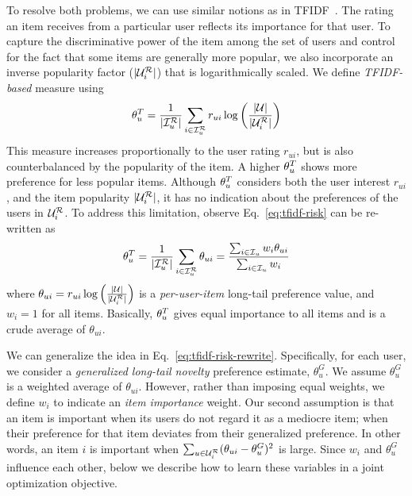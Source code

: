 

To resolve both problems, we can use similar notions as in TFIDF~\cite{salton1988term}.  The rating an item receives from a particular user reflects its importance for that user. To capture the discriminative power of the item among the set of users and control for the fact that some items are generally more popular, we also incorporate an inverse popularity factor  ($|\mathcal{U}_{i}^{\mathcal{R}}|$) that is logarithmically scaled. We define \textit{TFIDF-based} measure using 
\begin{align}
\small
\theta_u^{T} = \frac{ 1}{\vert \mathcal{I}_{u}^{\mathcal{R}} \vert} \sum_{i \in \mathcal{I}_{u}^{\mathcal{R}}} r_{ui} \log \left( \frac{|\mathcal{U}|}{ |\mathcal{U}_{i}^{\mathcal{R}}|} \right)
\label{eq:tfidf-risk}
\end{align}
This measure increases proportionally to the user rating $r_{ui}$, but is also counterbalanced by the popularity of the item. A higher  $\theta_u^{T}$ shows more preference for less popular items. 
Although $\theta_u^{T}$ considers both  the user interest $r_{ui}$, and the  item popularity $|\mathcal{U}_{i}^{\mathcal{R}}|$, it has no indication about the preferences of the users in $\mathcal{U}_{i}^{\mathcal{R}}$. 
To address this limitation, observe Eq.~\ref{eq:tfidf-risk} can be re-written  as
\begin{align}
\small
\theta_u^{T} = \frac{ 1}{\vert \mathcal{I}_{u}^{\mathcal{R}} \vert} \sum_{i \in \mathcal{I}_{u}^{\mathcal{R}}} \theta_{ui}  = \frac{ \sum_{i \in \mathcal{I}_u} w_i \theta_{ui}}{ \sum_{i \in \mathcal{I}_u} w_i }
\label{eq:tfidf-risk-rewrite}
\end{align}
where $\theta_{ui} = r_{ui} \log \left( \frac{|\mathcal{U}|}{|\mathcal{U}_{i}^{\mathcal{R}}|} \right)$ is a \textit{per-user-item} long-tail preference value, and  $w_{i} = 1$ for all items.  Basically,  $\theta_u^{T}$ gives equal importance to all items and is a crude average of $\theta_{ui}$.


%

We can generalize the idea in Eq.~\ref{eq:tfidf-risk-rewrite}. Specifically, for each user, we consider a  \textit{generalized long-tail novelty} preference estimate, $\theta_u^G$.  We assume $\theta_u^G$ is a  weighted average of $\theta_{ui}$.  However, rather than imposing equal weights, we define  $w_i$ to  indicate an \textit{item importance} weight. Our second assumption is that an item is important when its users do not regard it as a mediocre  item; when their preference for that item deviates  from their generalized preference.  In other words,  an item $i$ is important when $\sum_{u \in \mathcal{U}_{i}^{\mathcal{R}}} (\theta_{ui} - \theta_u^G)^2$ is large.   Since $w_i$ and $\theta^G_u$ influence each other, below we  describe how to learn these variables in a joint optimization objective. 



